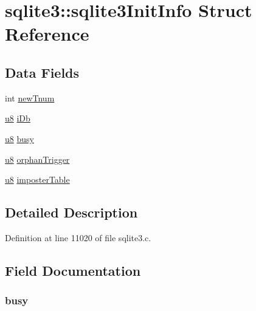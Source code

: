 \hypertarget{structsqlite3_1_1sqlite3_init_info}{}\section{sqlite3\+:\+:sqlite3\+Init\+Info Struct Reference}
\label{structsqlite3_1_1sqlite3_init_info}
\subsection*{Data Fields}
\begin{DoxyCompactItemize}
\item 
int \hyperlink{structsqlite3_1_1sqlite3_init_info_ab306156f4199316ebe4010f3842af971}{new\+Tnum}
\item 
\hyperlink{sqlite3_8c_a74a0f6424ae628af25f23f0a35f6ead3}{u8} \hyperlink{structsqlite3_1_1sqlite3_init_info_ad97383a37c115dd7fe5abb5aa420e738}{i\+Db}
\item 
\hyperlink{sqlite3_8c_a74a0f6424ae628af25f23f0a35f6ead3}{u8} \hyperlink{structsqlite3_1_1sqlite3_init_info_a1d41a2e0fbc5b759ca6bceaa2951c387}{busy}
\item 
\hyperlink{sqlite3_8c_a74a0f6424ae628af25f23f0a35f6ead3}{u8} \hyperlink{structsqlite3_1_1sqlite3_init_info_a7d8e852a59ea07bc9015f5cbe09d1b37}{orphan\+Trigger}
\item 
\hyperlink{sqlite3_8c_a74a0f6424ae628af25f23f0a35f6ead3}{u8} \hyperlink{structsqlite3_1_1sqlite3_init_info_a4a0d74dc228071d15bce855b20ef6b98}{imposter\+Table}
\end{DoxyCompactItemize}


\subsection{Detailed Description}


Definition at line 11020 of file sqlite3.\+c.



\subsection{Field Documentation}
\hypertarget{structsqlite3_1_1sqlite3_init_info_a1d41a2e0fbc5b759ca6bceaa2951c387}{}
\subsubsection[{busy}]{ busy}\label{structsqlite3_1_1sqlite3_init_info_a1d41a2e0fbc5b759ca6bceaa2951c387}


